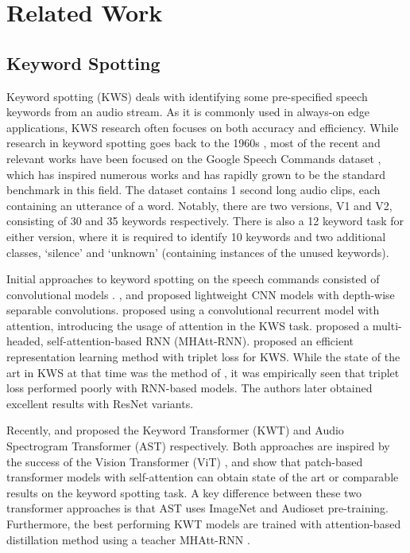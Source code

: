 \documentclass{article} \usepackage{iclr2022_conference,times}
\begin{document}
\section{Related Work}

\subsection{Keyword Spotting}
Keyword spotting (KWS) deals with identifying some pre-specified speech keywords from an audio stream. As it is commonly used in always-on edge applications, KWS research often focuses on both accuracy and efficiency. While research in keyword spotting goes back to the 1960s \citep{teacher1967experimental}, most of the recent and relevant works have been focused on the Google Speech Commands dataset \citep{warden2018speech}, which has inspired numerous works and has rapidly grown to be the standard benchmark in this field. The dataset contains 1 second long audio clips, each containing an utterance of a word. Notably, there are two versions, V1 and V2, consisting of 30 and 35 keywords respectively. There is also a 12 keyword task for either version, where it is required to identify 10 keywords and two additional classes, `silence' and `unknown' (containing instances of the unused keywords).

Initial approaches to keyword spotting on the speech commands consisted of convolutional models \citep{warden2018speech}. \citet{majumdar2020matchboxnet}, \citet{mordido2021compressing} and \citet{zhang2017end} proposed lightweight CNN models with depth-wise separable convolutions. \citet{de2018neural} proposed using a convolutional recurrent model with attention, introducing the usage of attention in the KWS task. \citet{rybakov2020streaming} proposed a multi-headed, self-attention-based RNN (MHAtt-RNN). \citet{vygon2021learning} proposed an efficient representation learning method with triplet loss for KWS. While the state of the art in KWS at that time was the method of \citet{rybakov2020streaming}, it was empirically seen that triplet loss performed poorly with RNN-based models. The authors later obtained excellent results with ResNet \citep{tang2018deep} variants.

Recently, \citet{berg21_interspeech} and \citet{gong2021ast} proposed the Keyword Transformer (KWT) and Audio Spectrogram Transformer (AST) respectively. Both approaches are inspired by the success of the Vision Transformer (ViT) \citep{dosovitskiy2020image}, and show that patch-based transformer models with self-attention can obtain state of the art or comparable results on the keyword spotting task. A key difference between these two transformer approaches is that AST uses ImageNet \citep{imagenet} and Audioset \citep{audioset} pre-training. Furthermore, the best performing KWT models are trained with attention-based distillation method \citep{touvron2021training} using a teacher MHAtt-RNN \citep{rybakov2020streaming}.
\end{document}
